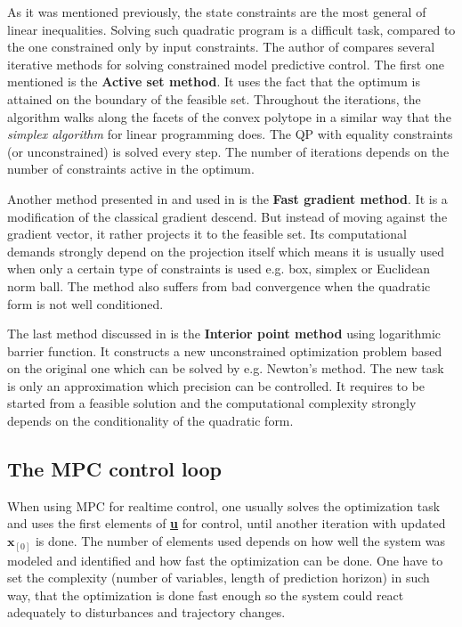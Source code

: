 As it was mentioned previously, the state constraints are the most general of linear inequalities. Solving such quadratic program is a difficult task, compared to the one constrained only by input constraints. The author of \citep{mikulas2013} compares several iterative methods for solving constrained model predictive control. The first one mentioned is the \textbf{Active set method}. It uses the fact that the optimum is attained on the boundary of the feasible set. Throughout the iterations, the algorithm walks along the facets of the convex polytope in a similar way that the \textit{simplex algorithm} for linear programming does. The QP with equality constraints (or unconstrained) is solved every step. The number of iterations depends on the number of constraints active in the optimum.

Another method presented in \citep{mikulas2013} and used in \citep{zometa2012segway} is the \textbf{Fast gradient method}. It is a modification of the classical gradient descend. But instead of moving against the gradient vector, it rather projects it to the feasible set. Its computational demands strongly depend on the projection itself which means it is usually used when only a certain type of constraints is used e.g. box, simplex or Euclidean norm ball. The method also suffers from bad convergence when the quadratic form is not well conditioned.

The last method discussed in \citep{mikulas2013} is the \textbf{Interior point method} using logarithmic barrier function. It constructs a new unconstrained optimization problem based on the original one which can be solved by e.g. Newton's method. The new task is only an approximation which precision can be controlled. It requires to be started from a feasible solution and the computational complexity strongly depends on the conditionality of the quadratic form.

\subsection{The MPC control loop}
\label{cap:qmpc_control_loop}

When using MPC for realtime control, one usually solves the optimization task and uses the first elements of \textbf{\underline{u}} for control, until another iteration with updated $\textbf{x}_{[0]}$ is done. The number of elements used depends on how well the system was modeled and identified and how fast the optimization can be done. One have to set the complexity (number of variables, length of prediction horizon) in such way, that the optimization is done fast enough so the system could react adequately to disturbances and trajectory changes.

